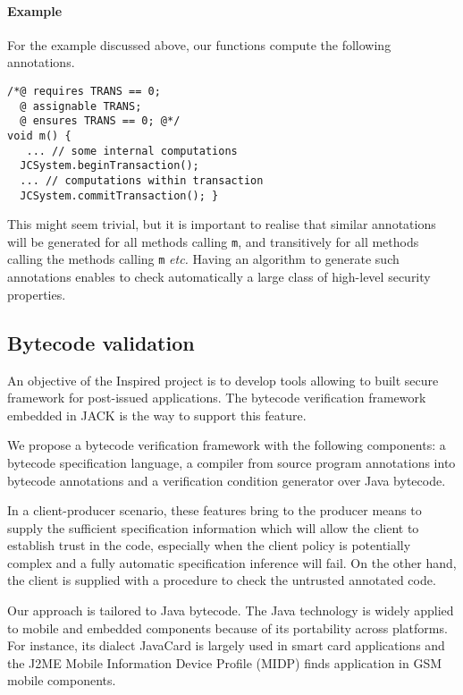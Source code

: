 \paragraph{Example}
For the example discussed above, our functions compute the following
annotations.

\begin{verbatim}
/*@ requires TRANS == 0;
  @ assignable TRANS;
  @ ensures TRANS == 0; @*/
void m() { 
   ... // some internal computations
  JCSystem.beginTransaction();
  ... // computations within transaction
  JCSystem.commitTransaction(); }
\end{verbatim}
This might seem trivial, but it is important to realise that similar
annotations will be generated for all methods calling
\texttt{m}, and transitively for all methods calling the methods
calling \texttt{m} \emph{etc.}
Having an algorithm to generate such annotations enables to check
automatically a large class of high-level security properties.


\subsection{Bytecode validation}
An objective of the Inspired project is to develop tools allowing to built secure framework for post-issued applications. The bytecode verification framework embedded in JACK is the way to support this feature.  

We propose a bytecode verification framework with the following components: a bytecode specification language, a compiler from source
 program annotations into bytecode annotations and a verification condition generator over Java bytecode.

In a client-producer scenario, these features bring to the producer means to supply the sufficient specification information 
which will allow the client to establish trust in the code, especially when the client policy is potentially complex and a fully automatic specification inference
will fail. On the other hand, the client is supplied with a procedure to check the untrusted annotated code. 

  

Our approach is tailored to Java bytecode.
The Java technology is widely applied to mobile and embedded components because of its portability across platforms. 
For instance, its dialect JavaCard is largely used in smart card applications and the J2ME Mobile Information Device Profile 
(MIDP) finds application in GSM mobile components. 

